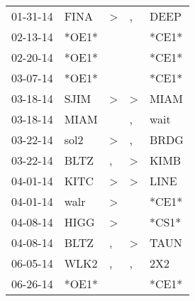 \begin{supertabular}{p{0.07\textwidth}p{0.06\textwidth}p{0.02\textwidth}p{0.02\textwidth}p{0.06\textwidth}}
          01-31-14\textsuperscript{} &           FINA\textsuperscript{} &     \textgreater &                , &           DEEP\textsuperscript{} \\
          02-13-14\textsuperscript{} &                            *OE1* &                  &                  &                            *CE1* \\
          02-20-14\textsuperscript{} &                            *OE1* &                  &                  &                            *CE1* \\
          03-07-14\textsuperscript{} &                            *OE1* &                  &                  &                            *CE1* \\
          03-18-14\textsuperscript{} &           SJIM\textsuperscript{} &     \textgreater &     \textgreater &           MIAM\textsuperscript{} \\
          03-18-14\textsuperscript{} &           MIAM\textsuperscript{} &                  &                , &           wait\textsuperscript{} \\
          03-22-14\textsuperscript{} &           sol2\textsuperscript{} &     \textgreater &                , &           BRDG\textsuperscript{} \\
          03-22-14\textsuperscript{} &           BLTZ\textsuperscript{} &                , &     \textgreater &           KIMB\textsuperscript{} \\
          04-01-14\textsuperscript{} &           KITC\textsuperscript{} &     \textgreater &     \textgreater &           LINE\textsuperscript{} \\
          04-01-14\textsuperscript{} &           walr\textsuperscript{} &     \textgreater &                  &                            *CE1* \\
          04-08-14\textsuperscript{} &           HIGG\textsuperscript{} &     \textgreater &                  &                            *CS1* \\
          04-08-14\textsuperscript{} &           BLTZ\textsuperscript{} &                , &     \textgreater &           TAUN\textsuperscript{} \\
          06-05-14\textsuperscript{} &           WLK2\textsuperscript{} &                , &                , &            2X2\textsuperscript{} \\
          06-26-14\textsuperscript{} &                            *OE1* &                  &                  &                            *CE1* \\

\end{supertabular}

